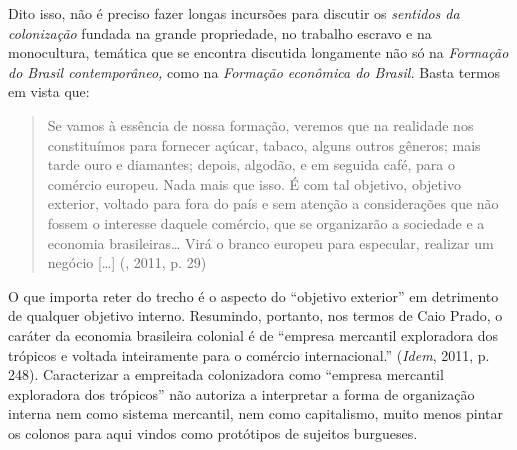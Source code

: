 Dito isso, não é preciso fazer longas incursões para discutir os
\emph{sentidos da colonização} fundada na grande propriedade, no
trabalho escravo e na monocultura, temática que se encontra discutida
longamente não só na \emph{Formação do Brasil contemporâneo,} como na
\emph{Formação econômica do Brasil.} Basta termos em vista que:

\begin{quote}
Se vamos à essência de nossa formação, veremos que na realidade nos
constituímos para fornecer açúcar, tabaco, alguns outros gêneros; mais
tarde ouro e diamantes; depois, algodão, e em seguida café, para o
comércio europeu. Nada mais que isso. É com tal objetivo, objetivo
exterior, voltado para fora do país e sem atenção a considerações que
não fossem o interesse daquele comércio, que se organizarão a sociedade
e a economia brasileiras\ldots{} Virá o branco europeu para especular,
realizar um negócio [\ldots{}] (, 2011, p. 29)
\end{quote}

O que importa reter do trecho é o aspecto do ``objetivo exterior'' em
detrimento de qualquer objetivo interno. Resumindo, portanto, nos termos
de Caio Prado, o caráter da economia brasileira colonial é de ``empresa
mercantil exploradora dos trópicos e voltada inteiramente para o
comércio internacional.'' (\emph{Idem}, 2011, p. 248). Caracterizar a
empreitada colonizadora como ``empresa mercantil exploradora dos
trópicos'' não autoriza a interpretar a forma de organização interna nem
como sistema mercantil, nem como capitalismo, muito menos pintar os
colonos para aqui vindos como protótipos de sujeitos burgueses.

